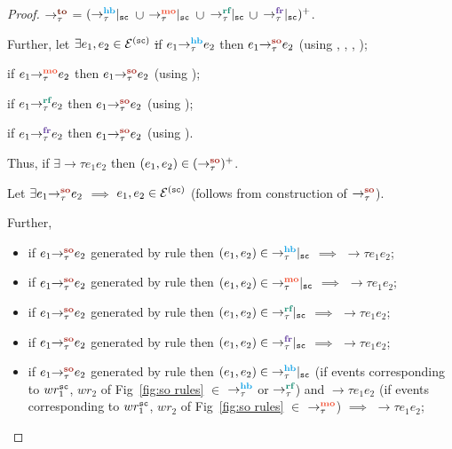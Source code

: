 \begin{proof}
	
	\noindent
	{\case{$\setTO \implies (\setSO)^+$}}
	
	$\setTO$ = $(\onsc{\setHB}$ $\union$ $\onsc{\setMO}$ $\union$
		$\onsc{\setRF}$ $\union$ $\onsc{\setFR})^+$.
	
	\noindent	Further, let $\exists e_1, e_2 \in \ordevents{\sc}$ \st
	
	if $\hb{\tau}{e_1}{e_2}$ then $\so{\tau}{e_1}{e_2}$ 
	(using , , , );
	
	if $\mo{\tau}{e_1}{e_2}$ then $\so{\tau}{e_1}{e_2}$ (using );
	
	if $\rf{\tau}{e_1}{e_2}$ then $\so{\tau}{e_1}{e_2}$ (using );
	
	if $\fr{\tau}{e_1}{e_2}$ then $\so{\tau}{e_1}{e_2}$ (using ).
	
	\noindent
	Thus, if $\exists \to{\tau}{e_1}{e_2}$ then $(e_1,e_2) \in (\setSO)^+$.
	
	{\case{$\setTO \impliedby (\setSO)^+$}}
	
	Let $\exists \so{\tau}{e_1}{e_2}$ $\implies$ $e_1,e_2 \in \ordevents{\sc}$
		(follows from construction of $\setSO$).
	
	Further,
	
	\begin{itemize}
	\item if $\so{\tau}{e_1}{e_2}$ generated by rule  then
		$(e_1,e_2) \in \onsc{\setHB}$ $\implies$ $\to{\tau}{e_1}{e_2}$;
		
	\item if $\so{\tau}{e_1}{e_2}$ generated by rule  then
		$(e_1,e_2) \in \onsc{\setMO}$ $\implies$ $\to{\tau}{e_1}{e_2}$;
		
	\item if $\so{\tau}{e_1}{e_2}$ generated by rule  then
		$(e_1,e_2) \in \onsc{\setRF}$ $\implies$ $\to{\tau}{e_1}{e_2}$;
		
	\item if $\so{\tau}{e_1}{e_2}$ generated by rule  then
		$(e_1,e_2) \in \onsc{\setFR}$ $\implies$ $\to{\tau}{e_1}{e_2}$;
		
	\item if $\so{\tau}{e_1}{e_2}$ generated by rule  then
	 $(e_1,e_2) \in \onsc{\setHB}$ (if events corresponding to $wr^\sc_1$, 
	 $wr_2$ of Fig~\ref{fig:so rules} $\in$ $\setHB$ or $\setRF$)
	 and $\to{\tau}{e_1}{e_2}$ (if events corresponding to $wr^\sc_1$, 
	 $wr_2$ of Fig~\ref{fig:so rules} $\in$ $\setMO$)
	 $\implies$ $\to{\tau}{e_1}{e_2}$;	
	 

\end{itemize}
\end{proof}
